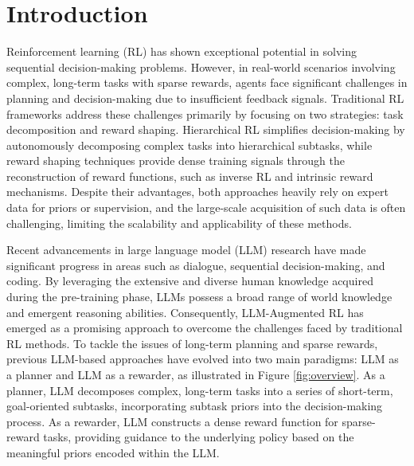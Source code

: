 \section{Introduction}
Reinforcement learning (RL) has shown exceptional potential in solving sequential decision-making problems.
However, in real-world scenarios involving complex, long-term tasks with sparse rewards, agents face significant challenges in planning and decision-making due to insufficient feedback signals\cite{sutton1998reinforcement, dulac2021challenges}.
Traditional RL frameworks address these challenges primarily by focusing on two strategies: task decomposition and reward shaping.
Hierarchical RL\cite{nachum2018data, pateria2021hierarchical} simplifies decision-making by autonomously decomposing complex tasks into hierarchical subtasks, while reward shaping techniques provide dense training signals through the reconstruction of reward functions, such as inverse RL\cite{arora2021survey, ziebart2008maximum, finn2016guided} and intrinsic reward mechanisms\cite{wan2023deir}.
Despite their advantages, both approaches heavily rely on expert data for priors\cite{penzkofer2024int} or supervision\cite{pan2018human}, and the large-scale acquisition of such data is often challenging, limiting the scalability and applicability of these methods.

Recent advancements in large language model (LLM) research have made significant progress in areas such as dialogue\cite{yi2024survey, brooks2023large}, sequential decision-making\cite{zhao2024expel, zhai2025enhancing}, and coding\cite{roziere2023code, yan2023codescope, yang2024qwen2}.
By leveraging the extensive and diverse human knowledge acquired during the pre-training phase, LLMs possess a broad range of world knowledge and emergent reasoning abilities\cite{yao2023react, guo2025deepseek}.
Consequently, LLM-Augmented RL has emerged as a promising approach to overcome the challenges faced by traditional RL methods\cite{cao2024surveylargelanguagemodelenhanced}.
To tackle the issues of long-term planning and sparse rewards, previous LLM-based approaches have evolved into two main paradigms: LLM as a planner\cite{brohan2023can, dalal2024plan, du2023guiding} and LLM as a rewarder\cite{xie2024text2reward, ma2023eureka, hazra2024revolve}, as illustrated in Figure \ref{fig:overview}.
As a planner, LLM decomposes complex, long-term tasks into a series of short-term, goal-oriented subtasks, incorporating subtask priors into the decision-making process.
As a rewarder, LLM constructs a dense reward function for sparse-reward tasks, providing guidance to the underlying policy based on the meaningful priors encoded within the LLM.

